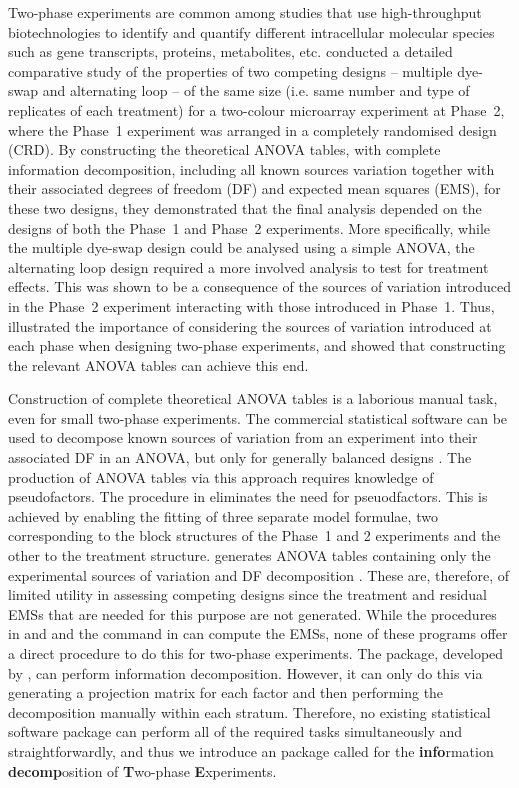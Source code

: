\documentclass[article]{jss}
\begin{document}
Two-phase experiments are common among studies that use high-throughput biotechnologies to identify and quantify different intracellular molecular species such as gene transcripts, proteins, metabolites, etc. \cite{Jarrett2008} conducted a detailed comparative study of the properties of two competing designs -- multiple dye-swap and alternating loop \citep{Churchill2002} -- of the same size (i.e. same number and type of replicates of each treatment) for a two-colour microarray experiment at Phase~2, where the Phase~1 experiment was arranged in a completely randomised design (CRD). By constructing the theoretical ANOVA tables, with complete information decomposition, including all known sources variation together with their associated degrees of freedom (DF) and expected mean squares (EMS), for these two designs, they demonstrated that the final analysis depended on the designs of both the Phase~1 and Phase~2 experiments. More specifically, while the multiple dye-swap design could be analysed using a simple ANOVA, the alternating loop design required a more involved analysis to test for treatment effects. This was shown to be a consequence of the sources of variation introduced in the Phase~2 experiment interacting with those introduced in Phase~1. Thus, \cite{Jarrett2008} illustrated the importance of considering the sources of variation introduced at each phase when designing two-phase experiments, and showed that constructing the relevant ANOVA tables can achieve this end.

Construction of complete theoretical ANOVA tables is a laborious manual task, even for small two-phase experiments. The commercial statistical software  can be used to decompose known sources of variation from an experiment into their associated DF in an ANOVA, but only for generally balanced designs \citep{Payne2003}. The production of ANOVA tables via this approach requires knowledge of pseudofactors. The  procedure in  eliminates the need for pseuodfactors. This is achieved by enabling the fitting of three separate model formulae, two corresponding to the block structures of the Phase~1 and 2 experiments and the other to the treatment structure.  generates ANOVA tables containing only the experimental sources of variation and DF decomposition \citep{Brien2006a}. These are, therefore, of limited utility in assessing competing designs since the treatment and residual EMSs that are needed for this purpose are not generated. While the  procedures in  and  and the  command in  can compute the EMSs, none of these programs offer a direct procedure to do this for two-phase experiments. The   package, developed by \cite{Brien2011a}, can perform information decomposition. However, it can only do this via generating a projection matrix for each factor and then performing the decomposition manually within each stratum. Therefore, no existing statistical software package can perform all of the required tasks simultaneously and straightforwardly, and thus we introduce an  package called  for the {\bf info}rmation {\bf decomp}osition of {\bf T}wo-phase {\bf E}xperiments.
\end{document}

